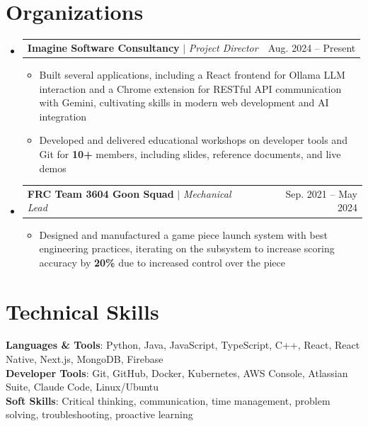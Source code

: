 \documentclass[letterpaper,11pt]{article}
\makeatletter
\newcommand{\resumeItem}[1]{
  \item\small{
    {#1 \vspace{-4pt}}
  }
}
\newcommand{\resumeProjectHeading}[2]{
    \item
    \begin{tabular*}{0.97\textwidth}{l@{\extracolsep{\fill}}r}
      \small#1 & #2 \\
    \end{tabular*}\vspace{-7pt}
}
\newcommand{\resumeSubHeadingListStart}{\begin{itemize}[leftmargin=0.15in, label={}]}
\newcommand{\resumeSubHeadingListEnd}{\end{itemize}}
\newcommand{\resumeItemListStart}{\begin{itemize}}
\newcommand{\resumeItemListEnd}{\end{itemize}\vspace{-5pt}}
\makeatother
\begin{document}
\section{Organizations}
  \resumeSubHeadingListStart

    \resumeProjectHeading
      {\textbf{Imagine Software Consultancy} $|$ \emph{Project Director}}{Aug. 2024 -- Present}
      \resumeItemListStart
        \resumeItem{Built several applications, including a React frontend for Ollama LLM interaction and a Chrome extension for RESTful API communication with Gemini, cultivating skills in modern web development and AI integration}
        \resumeItem{Developed and delivered educational workshops on developer tools and Git for \textbf{10+} members, including slides, reference documents, and live demos}
      \resumeItemListEnd

    \resumeProjectHeading
      {\textbf{FRC Team 3604 Goon Squad} $|$ \emph{Mechanical Lead}}{Sep. 2021 -- May 2024}
      \resumeItemListStart
        \resumeItem{Designed and manufactured a game piece launch system with best engineering practices, iterating on the subsystem to increase scoring accuracy by \textbf{20\%} due to increased control over the piece}
      \resumeItemListEnd

 \resumeSubHeadingListEnd
 
%
\section{Technical Skills}
 \begin{itemize}[leftmargin=0.15in, label={}]
    \small{\item{
     \textbf{Languages \& Tools}{: Python, Java, JavaScript, TypeScript, C++, React, React Native, Next.js, MongoDB, Firebase} \\
     \textbf{Developer Tools}{: Git, GitHub, Docker, Kubernetes, AWS Console, Atlassian Suite, Claude Code, Linux/Ubuntu} \\
     \textbf{Soft Skills}{: Critical thinking, communication, time management, problem solving, troubleshooting, proactive learning} \\
    }}
 \end{itemize}


\end{document}
